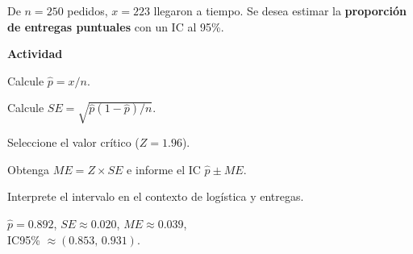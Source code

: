 \begin{ejercicio}[Entregas a tiempo (n=250)]
De $n=250$ pedidos, $x=223$ llegaron a tiempo.
Se desea estimar la \textbf{proporción de entregas puntuales} con un IC al 95\%.


\textbf{Actividad}
\begin{pasos}
  \item Calcule $\hat{p} = x/n$.
  \item Calcule $SE = \sqrt{\hat{p}(1-\hat{p})/n}$.
  \item Seleccione el valor crítico ($Z=1.96$).
  \item Obtenga $ME=Z \times SE$ e informe el IC $\hat{p}\pm ME$.
  \item Interprete el intervalo en el contexto de logística y entregas.
\end{pasos}

\begin{clave}
$\hat{p}=0.892$, \quad $SE\approx0.020$, \quad $ME\approx0.039$,\\
IC95\% $\approx (0.853,\,0.931)$.
\end{clave}
\end{ejercicio}